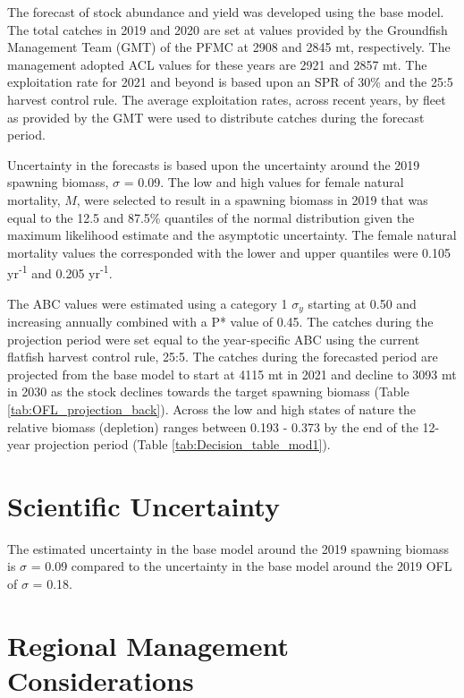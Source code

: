 \documentclass[12pt,]{article}
\begin{document}
The forecast of stock abundance and yield was developed using the base
model. The total catches in 2019 and 2020 are set at values provided by
the Groundfish Management Team (GMT) of the PFMC at 2908 and 2845 mt,
respectively. The management adopted ACL values for these years are 2921
and 2857 mt. The exploitation rate for 2021 and beyond is based upon an
SPR of 30\% and the 25:5 harvest control rule. The average exploitation
rates, across recent years, by fleet as provided by the GMT were used to
distribute catches during the forecast period.

Uncertainty in the forecasts is based upon the uncertainty around the
2019 spawning biomass, \(\sigma\) = 0.09. The low and high values for
female natural mortality, \(M\), were selected to result in a spawning
biomass in 2019 that was equal to the 12.5 and 87.5\% quantiles of the
normal distribution given the maximum likelihood estimate and the
asymptotic uncertainty. The female natural mortality values the
corresponded with the lower and upper quantiles were 0.105
yr\textsuperscript{-1} and 0.205 yr\textsuperscript{-1}.

The ABC values were estimated using a category 1 \(\sigma_y\) starting
at 0.50 and increasing annually combined with a P* value of 0.45. The
catches during the projection period were set equal to the year-specific
ABC using the current flatfish harvest control rule, 25:5. The catches
during the forecasted period are projected from the base model to start
at 4115 mt in 2021 and decline to 3093 mt in 2030 as the stock declines
towards the target spawning biomass (Table
\ref{tab:OFL_projection_back}). Across the low and high states of nature
the relative biomass (depletion) ranges between 0.193 - 0.373 by the end
of the 12-year projection period (Table \ref{tab:Decision_table_mod1}).

\section{Scientific Uncertainty}\label{scientific-uncertainty-1}

The estimated uncertainty in the base model around the 2019 spawning
biomass is \(\sigma\) = 0.09 compared to the uncertainty in the base
model around the 2019 OFL of \(\sigma\) = 0.18.

\section{Regional Management
Considerations}\label{regional-management-considerations}
\end{document}
